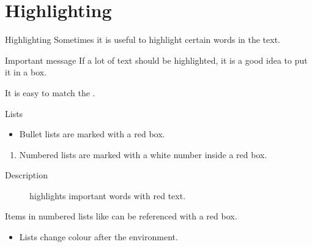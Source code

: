 \section{Highlighting}
\SectionPage
\begin{frame}{Highlighting}
    Sometimes it is useful to \alert{highlight} certain words in the text.

    \begin{alertblock}{Important message}
        If a lot of text should be \alert{highlighted}, it is a good idea to put it in a box.
    \end{alertblock}

    It is easy to match the .
\end{frame}

\begin{frame}{Lists}
    \begin{itemize}
        \item
        Bullet lists are marked with a red box.
    \end{itemize}

    \begin{enumerate}
        \item
        \label{enum:item}
        Numbered lists are marked with a white number inside a red box.
    \end{enumerate}

    \begin{description}
        \item[Description] highlights important words with red text.
    \end{description}

    Items in numbered lists like  can be referenced with a red box.

    \begin{example}
        \begin{itemize}
            \item
            Lists change colour after the environment.
        \end{itemize}
    \end{example}
\end{frame}

